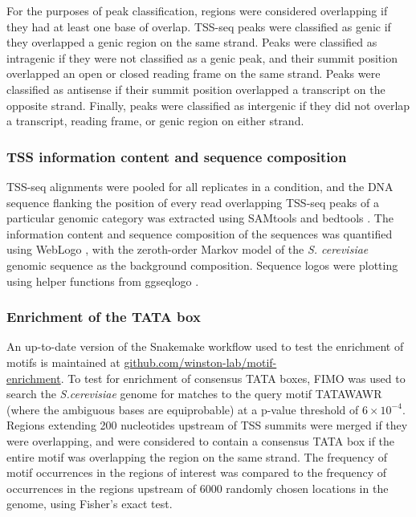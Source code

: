 For the purposes of peak classification, regions were considered overlapping if they had at least one base of overlap.
TSS-seq peaks were classified as genic if they overlapped a genic region on the same strand.
Peaks were classified as intragenic if they were not classified as a genic peak, and their summit position overlapped an open or closed reading frame on the same strand.
Peaks were classified as antisense if their summit position overlapped a transcript on the opposite strand.
Finally, peaks were classified as intergenic if they did not overlap a transcript, reading frame, or genic region on either strand.

\subsubsection{TSS information content and sequence composition}
\label{subsubsec:tss_seqlogos}

TSS-seq alignments were pooled for all replicates in a condition, and the DNA sequence flanking the position of every read overlapping TSS-seq peaks of a particular genomic category was extracted using SAMtools \citep{li2009} and bedtools \citep{quinlan2010}.
The information content and sequence composition of the sequences was quantified using WebLogo \citep{crooks2004}, with the zeroth-order Markov model of the \textit{S. cerevisiae} genomic sequence as the background composition.
Sequence logos were plotting using helper functions from ggseqlogo \citep{wagih2017}.

\subsubsection{Enrichment of the TATA box}

An up-to-date version of the Snakemake \citep{koster2012} workflow used to test the enrichment of motifs is maintained at \href{https://github.com/winston-lab/motif-enrichment}{github.com/winston-lab/motif-\\enrichment}.
To test for enrichment of consensus TATA boxes, FIMO \citep{grant2011} was used to search the \textit{S.cerevisiae} genome for matches to the query motif TATAWAWR (where the ambiguous bases are equiprobable) at a p-value threshold of $6 \times 10^{-4}$.
Regions extending 200 nucleotides upstream of TSS summits were merged if they were overlapping, and were considered to contain a consensus TATA box if the entire motif was overlapping the region on the same strand.
The frequency of motif occurrences in the regions of interest was compared to the frequency of occurrences in the regions upstream of 6000 randomly chosen locations in the genome, using Fisher's exact test.

